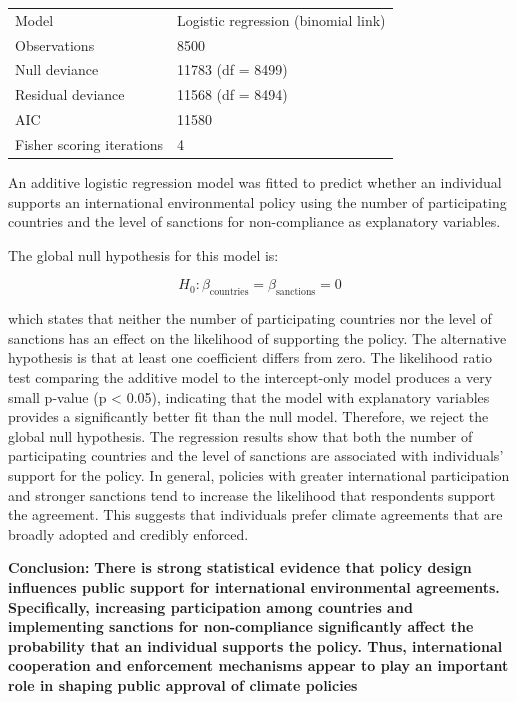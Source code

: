 \documentclass[12pt,letterpaper]{article}
\begin{document}
\begin{enumerate}
\begin{enumerate}
\begin{table}[htbp]
			\begin{tabular}{ll}
				Model & Logistic regression (binomial link) \\
				Observations & 8500 \\
				Null deviance & 11783 (df = 8499) \\
				Residual deviance & 11568 (df = 8494) \\
				AIC & 11580 \\
				Fisher scoring iterations & 4 \\
			\end{tabular}
			
		\end{table}
		
An additive logistic regression model was fitted to predict whether an individual supports an international environmental policy using the number of participating countries and the level of sanctions for non-compliance as explanatory variables.
	
	The global null hypothesis for this model is:
	
	\[
	H_0: \beta_{\text{countries}} = \beta_{\text{sanctions}} = 0
	\]
	
	
	which states that neither the number of participating countries nor the level of sanctions has an effect on the likelihood of supporting the policy. The alternative hypothesis is that at least one coefficient differs from zero.
		\vspace{0.3cm}
	The likelihood ratio test comparing the additive model to the intercept-only model produces a very small p-value (p < 0.05), indicating that the model with explanatory variables provides a significantly better fit than the null model. Therefore, we reject the global null hypothesis.
		\vspace{0.3cm}
		The regression results show that both the number of participating countries and the level of sanctions are associated with individuals’ support for the policy. In general, policies with greater international participation and stronger sanctions tend to increase the likelihood that respondents support the agreement. This suggests that individuals prefer climate agreements that are broadly adopted and credibly enforced.
			\vspace{0.3cm}
	
	\textbf{Conclusion:}
	\textbf{There is strong statistical evidence that policy design influences public support for international environmental agreements. Specifically, increasing participation among countries and implementing sanctions for non-compliance significantly affect the probability that an individual supports the policy. Thus, international cooperation and enforcement mechanisms appear to play an important role in shaping public approval of climate policies}
		

\end{enumerate}
\end{enumerate}
\end{document}
